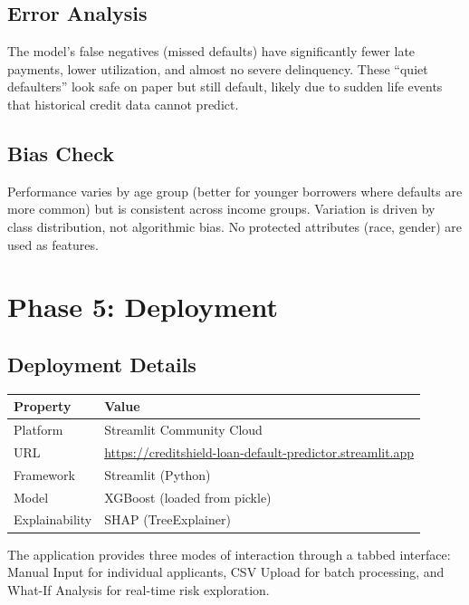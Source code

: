 \documentclass[12pt, a4paper]{article}
\begin{document}
\subsection{Error Analysis}

The model's false negatives (missed defaults) have significantly fewer late payments, lower utilization, and almost no severe delinquency. These ``quiet defaulters'' look safe on paper but still default, likely due to sudden life events that historical credit data cannot predict.

\subsection{Bias Check}

Performance varies by age group (better for younger borrowers where defaults are more common) but is consistent across income groups. Variation is driven by class distribution, not algorithmic bias. No protected attributes (race, gender) are used as features.




\section{Phase 5: Deployment}

\subsection{Deployment Details}

\begin{table}[H]
\centering
\begin{tabular}{ll}
\toprule
\textbf{Property} & \textbf{Value} \\
\midrule
Platform & Streamlit Community Cloud \\
URL & \url{https://creditshield-loan-default-predictor.streamlit.app} \\
Framework & Streamlit (Python) \\
Model & XGBoost (loaded from pickle) \\
Explainability & SHAP (TreeExplainer) \\
\bottomrule
\end{tabular}
\end{table}

The application provides three modes of interaction through a tabbed interface: Manual Input for individual applicants, CSV Upload for batch processing, and What-If Analysis for real-time risk exploration.
\end{document}
